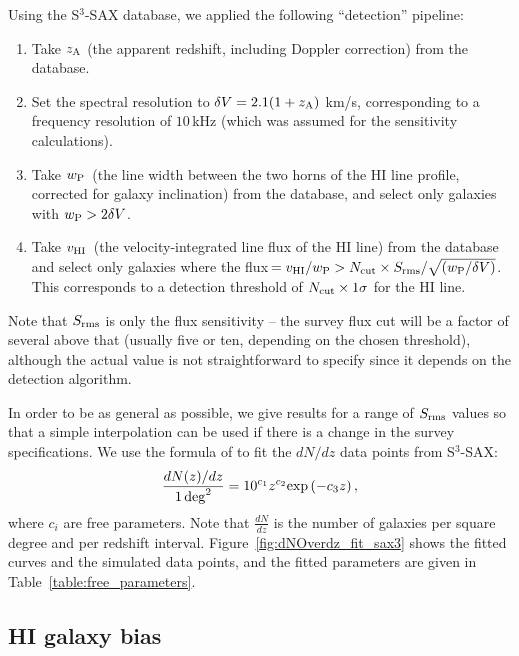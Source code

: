 \documentclass[useAMS,usenatbib]{mn2e}
\begin{document}
Using the S$^3$-SAX database, we applied the following ``detection'' pipeline:
\begin{enumerate}
\item Take $z_{\rm A}$ (the apparent redshift, including Doppler correction) from the database.
\item Set the spectral resolution to $\delta V = 2.1(1+z_{\rm A})$ km/s, corresponding to a frequency resolution of $10\,$kHz (which was assumed for the sensitivity calculations).
\item
Take $w_{\rm P}\,$ (the line width between the two horns of the HI line profile, corrected for galaxy inclination) from the database, and select only galaxies with $w_{\rm P} > 2 \delta V$.
\item
Take $v_{\rm HI}\,$ (the velocity-integrated line flux of the HI line) from the database and select only galaxies where the flux$\, =  v_{\rm HI} /w_{\rm P}>N_{\rm cut} \times S_{\rm rms}/\sqrt{(w_{\rm P}/\delta V)}$. This corresponds to a detection threshold of $N_{\rm cut} \times 1 \sigma$ for the HI line.
\end{enumerate}
Note that $S_{\rm rms}$ is only the flux sensitivity -- the survey flux cut will be a factor of several above that (usually five or ten, depending on the chosen threshold), although the actual value is not straightforward to specify since it depends on the detection algorithm.



In order to be as general as possible, we give results for a range of $S_{\rm rms}$ values so that a simple interpolation can be used if there is a change in the survey specifications. 
We use the  formula of \citet{2009ApJ...703.1890O} to fit the $dN/dz$ data points from S$^3$-SAX:
\begin{equation}
\frac{{ d}N(z)/ {d}z}{{1\, \rm deg}^2}= 10^{c_1} z^{c_2} {\rm exp}\left( - c_3 z\right), 
\label{equ:dndz}
\end{equation}
where $c_i$ are free parameters. Note that $\frac{dN}{dz}$ is the number of galaxies per square degree and per redshift interval.
Figure~\ref{fig:dNOverdz_fit_sax3} shows the fitted curves and the simulated data points, and the fitted parameters are given in Table~\ref{table:free_parameters}.



\subsection{HI galaxy bias}\label{HI_galaxy_bias}
\end{document}

